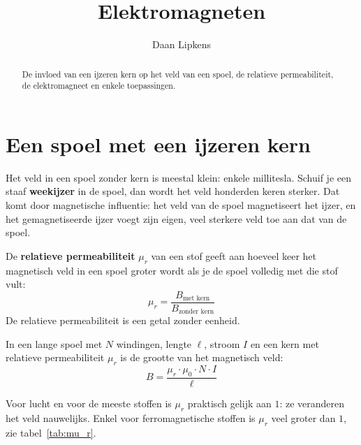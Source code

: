 \documentclass{ximera}
\title{Elektromagneten}
\author{Daan Lipkens}
\begin{document}
\begin{abstract}
    De invloed van een ijzeren kern op het veld van een spoel, de relatieve permeabiliteit, de elektromagneet en enkele toepassingen.
\end{abstract}
\maketitle

\section{Een spoel met een ijzeren kern}\label{sec:elektromagneet}
Het veld in een spoel zonder kern is meestal klein: enkele millitesla. Schuif je een staaf \textbf{weekijzer} in de spoel, dan wordt het veld honderden keren sterker. Dat komt door magnetische influentie: het veld van de spoel magnetiseert het ijzer, en het gemagnetiseerde ijzer voegt zijn eigen, veel sterkere veld toe aan dat van de spoel.

\begin{definition}[foldable=true,title={Relatieve permeabiliteit}]\nl
    De \textbf{relatieve permeabiliteit} $\mu_r$ van een stof geeft aan hoeveel keer het magnetisch veld in een spoel groter wordt als je de spoel volledig met die stof vult:
    \begin{equation*}
        \mu_r = \frac{B_{\text{met kern}}}{B_{\text{zonder kern}}}
    \end{equation*}
    De relatieve permeabiliteit is een getal zonder eenheid.
\end{definition}

\begin{proposition}[foldable=true,title={Magnetisch veld in een spoel met kern}]\nl
    In een lange spoel met $N$ windingen, lengte $\ell$, stroom $I$ en een kern met relatieve permeabiliteit $\mu_r$ is de grootte van het magnetisch veld:
    \begin{equation}\label{eq:B_spoel_kern}
        B = \frac{\mu_r \cdot \mu_0 \cdot N \cdot I}{\ell}
    \end{equation}
\end{proposition}

Voor lucht en voor de meeste stoffen is $\mu_r$ praktisch gelijk aan $1$: ze veranderen het veld nauwelijks. Enkel voor ferromagnetische stoffen is $\mu_r$ veel groter dan $1$, zie tabel~\ref{tab:mu_r}.
\end{document}
